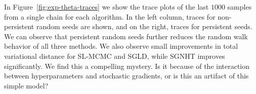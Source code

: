 \documentclass[]{article}
\begin{document}
In Figure~\ref{fig:exp-theta-traces} we show the trace plots of the last $1000$ samples from a single chain for each algorithm.  In the left column, traces for non-persistent random seeds are shown, and on the right, traces for persistent seeds.  We can observe that persistent random seeds further reduces the random walk behavior of all three methods.  We also observe small improvements in total variational distance for SL-MCMC and SGLD, while SGNHT improves significantly. We find this a compelling mystery.  Is it because of the interaction between hyperparameters and stochastic gradients, or is this an artifact of this simple model?

\end{document}
